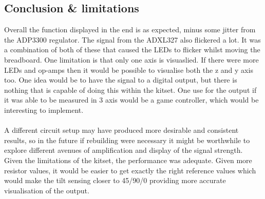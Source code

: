 \documentclass[12pt]{article}
\begin{document}
    \subsection{Conclusion \& limitations}
    Overall the function displayed in the end is as expected, minus some jitter from the ADP3300 regulator. The signal from the ADXL327 also flickered a lot. It was a combination
    of both of these that caused the LEDs to flicker whilst moving the breadboard. One limitation is that only one axis is visuaslied. If there were more LEDs and op-amps
    then it would be possible to visualise both the z and y axis too. One idea would be to have the signal to a digital output, but there is nothing that is capable of doing
    this within the kitset. One use for the output if it was able to be measured in 3 axis would be a game controller, which would be interesting to implement. \\ \\
    A different circuit setup may have produced more desirable and consistent results, so in the future if rebuilding were necessary it might be worthwhile to explore different
    avenues of amplification and display of the signal strength. Given the limitations of the kitset, the performance was adequate. Given more resistor values, it would be
    easier to get exactly the right reference values which would make the tilt sensing closer to 45/90/0 providing more accurate visualisation of the output.
\end{document}
